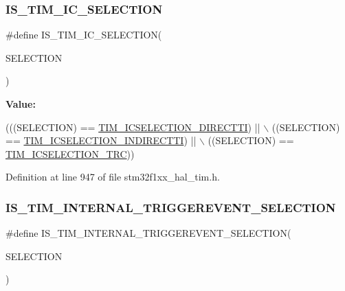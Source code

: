 \subsubsection{\texorpdfstring{I\+S\+\_\+\+T\+I\+M\+\_\+\+I\+C\+\_\+\+S\+E\+L\+E\+C\+T\+I\+ON}{IS\_TIM\_IC\_SELECTION}}
{\footnotesize\ttfamily \#define I\+S\+\_\+\+T\+I\+M\+\_\+\+I\+C\+\_\+\+S\+E\+L\+E\+C\+T\+I\+ON(\begin{DoxyParamCaption}\item[{}]{S\+E\+L\+E\+C\+T\+I\+ON }\end{DoxyParamCaption})}

{\bfseries Value\+:}
\begin{DoxyCode}
(((SELECTION) == \hyperlink{group___t_i_m___input___capture___selection_gac3be2fd9c576e84e0ebcfc7b3c0773a3}{TIM\_ICSELECTION\_DIRECTTI})   || \(\backslash\)
                                        ((SELECTION) == 
      \hyperlink{group___t_i_m___input___capture___selection_gab9754d4318abcd7fe725e3ee2e4496d4}{TIM\_ICSELECTION\_INDIRECTTI}) || \(\backslash\)
                                        ((SELECTION) == \hyperlink{group___t_i_m___input___capture___selection_ga9e0191bbf1a82dd9150b9283c39276e7}{TIM\_ICSELECTION\_TRC}))
\end{DoxyCode}


Definition at line 947 of file stm32f1xx\+\_\+hal\+\_\+tim.\+h.

\mbox{\label{group___t_i_m___private___macros_ga61f2191bcef866428ae8dedce576e58a}} 
\subsubsection{\texorpdfstring{I\+S\+\_\+\+T\+I\+M\+\_\+\+I\+N\+T\+E\+R\+N\+A\+L\+\_\+\+T\+R\+I\+G\+G\+E\+R\+E\+V\+E\+N\+T\+\_\+\+S\+E\+L\+E\+C\+T\+I\+ON}{IS\_TIM\_INTERNAL\_TRIGGEREVENT\_SELECTION}}
{\footnotesize\ttfamily \#define I\+S\+\_\+\+T\+I\+M\+\_\+\+I\+N\+T\+E\+R\+N\+A\+L\+\_\+\+T\+R\+I\+G\+G\+E\+R\+E\+V\+E\+N\+T\+\_\+\+S\+E\+L\+E\+C\+T\+I\+ON(\begin{DoxyParamCaption}\item[{}]{S\+E\+L\+E\+C\+T\+I\+ON }\end{DoxyParamCaption})}

